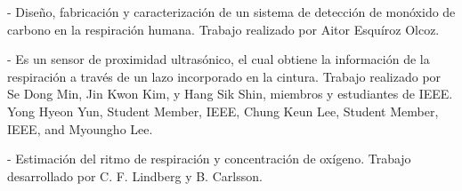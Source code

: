 \documentclass{IEEEtran}
\begin{document}
		\cite{esquiroz2017diseno} - Diseño, fabricación y caracterización de un sistema de
detección de monóxido de carbono en la respiración humana. Trabajo realizado por Aitor Esquíroz Olcoz.

		\cite{min2010noncontact} - Es un sensor de proximidad ultrasónico, el cual obtiene la información de la respiración a través de un lazo incorporado en la cintura. Trabajo realizado por Se Dong Min, Jin Kwon Kim, y Hang Sik Shin, miembros y estudiantes de IEEE.
Yong Hyeon Yun, Student Member, IEEE, Chung Keun Lee, Student Member, IEEE, and Myoungho Lee.

		\cite{lindberg1996estimation} - Estimación del ritmo de respiración y concentración de oxígeno. Trabajo desarrollado por C. F. Lindberg y B. Carlsson.

			
		
	
\end{document}
